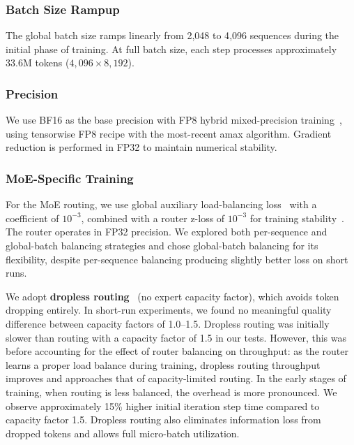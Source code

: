 \documentclass[11pt,a4paper]{article}
\begin{document}
\subsubsection{Batch Size Rampup}

The global batch size ramps linearly from 2{,}048 to 4{,}096 sequences during
the initial phase of training. At full batch size, each step processes
approximately 33.6M tokens ($4{,}096 \times 8{,}192$).

\subsubsection{Precision}
\label{sec:precision}

We use BF16 as the base precision with FP8 hybrid mixed-precision
training~\cite{micikevicius2022fp8}, using tensorwise FP8 recipe with the
most-recent amax algorithm. Gradient reduction is performed in FP32 to maintain
numerical stability.

\subsubsection{MoE-Specific Training}

For the MoE routing, we use global auxiliary load-balancing
loss~\cite{fedus2022switch} with a coefficient of $10^{-3}$, combined with
a router z-loss of $10^{-3}$ for training stability~\cite{zoph2022stmoe}. The router operates in
FP32 precision. We explored both per-sequence and global-batch balancing strategies and
chose global-batch balancing for its flexibility, despite per-sequence balancing producing slightly better loss on short runs.

We adopt \textbf{dropless routing}~\cite{gale2023megablocks} (no expert capacity factor), which avoids
token dropping entirely. In short-run experiments, we found no meaningful
quality difference between capacity factors of 1.0--1.5. Dropless routing
was initially slower than routing with a capacity factor of 1.5 in our tests.
However, this was before accounting for the effect of router balancing on
throughput: as the router learns a proper load balance during training,
dropless routing throughput improves and approaches that of capacity-limited
routing. In the early stages of training, when routing is less balanced, the
overhead is more pronounced. We observe approximately
15\% higher initial iteration step time compared to capacity factor 1.5. Dropless routing
also eliminates information loss from dropped tokens and allows full
micro-batch utilization.
\end{document}
